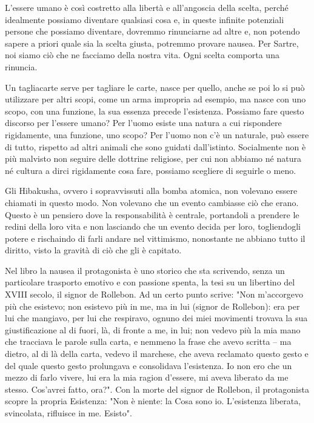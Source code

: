 \documentclass[12pt]{book} %
\begin{document}
L'essere umano è così costretto alla libertà e all'angoscia
della scelta, perché idealmente possiamo diventare qualsiasi cosa e, in queste infinite potenziali persone che possiamo diventare, dovremmo rinunciarne ad altre e, non potendo sapere a priori quale sia la scelta giusta, potremmo provare nausea. Per
Sartre, noi siamo ciò che ne facciamo della nostra vita. 
Ogni scelta comporta una rinuncia. 

Un tagliacarte serve per tagliare le carte, nasce per quello, anche se poi lo si può utilizzare per altri scopi, come un
arma impropria ad esempio, ma nasce con uno scopo, con una funzione, la sua essenza precede l'esistenza. Possiamo fare
questo discorso per l'essere umano? Per l'uomo esiste una natura a cui rispondere rigidamente, una funzione, uno scopo?
Per l'uomo non c'è un naturale, può essere di tutto, rispetto ad altri animali che sono
guidati dall'istinto. Socialmente non è più malvisto non seguire delle dottrine religiose, per cui non abbiamo né
natura né cultura a dirci rigidamente cosa fare, possiamo scegliere di seguirle o meno. 

Gli Hibakusha, ovvero i sopravvissuti alla bomba atomica, non volevano essere chiamati in questo modo. Non volevano che
un evento cambiasse ciò che erano. Questo è un pensiero dove la responsabilità è centrale, portandoli a prendere le
redini della loro vita e non lasciando che un evento decida per loro, togliendogli potere e rischaindo di farli andare nel vittimismo, nonostante ne abbiano tutto il diritto, visto la gravità di ciò che gli è capitato. 

Nel libro la nausea il protagonista è uno storico che sta scrivendo,
senza un particolare trasporto emotivo e con passione spenta, la tesi su un libertino del XVIII secolo, il signor de
Rollebon. Ad un certo punto scrive: "Non m'accorgevo più che esistevo; non
esistevo più in me, ma in lui (signor de Rollebon): era per lui che mangiavo, per lui che respiravo, ognuno dei miei
movimenti trovava la sua giustificazione al di fuori, là, di fronte a me, in lui; non vedevo più la mia mano che
tracciava le parole sulla carta, e nemmeno la frase che avevo scritta – ma dietro, al di là della carta, vedevo il
marchese, che aveva reclamato questo gesto e del quale questo gesto prolungava e consolidava
l'esistenza. Io non ero che un mezzo di farlo vivere, lui era la mia ragion
d'essere, mi aveva liberato da me stesso. Cos'avrei fatto,
ora?". Con la morte del signor de Rollebon, il protagonista scopre la propria Esistenza:
"Non è niente: la Cosa sono io. L'esistenza liberata, svincolata, rifluisce
in me. Esisto". 
\end{document}
